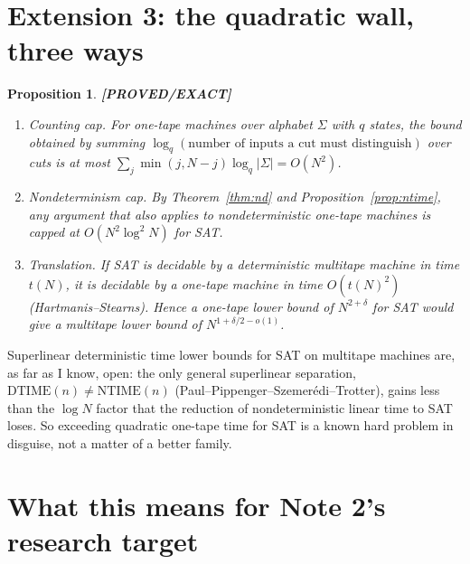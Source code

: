 \documentclass[11pt]{article}
\newtheorem{proposition}[theorem]{Proposition}
\theoremstyle{remark}
\newcommand{\status}[1]{\textbf{[#1]}}
\begin{document}
\section{Extension 3: the quadratic wall, three ways}

\begin{proposition}\label{prop:wall} \status{PROVED/EXACT}
\begin{enumerate}
\item \emph{Counting cap.} For one-tape machines over alphabet $\Sigma$ with $q$ states, the bound obtained by
summing $\log_q(\text{number of inputs a cut must distinguish})$ over cuts is at most
$\sum_j\min(j,N-j)\log_q|\Sigma|=O(N^2)$.
\item \emph{Nondeterminism cap.} By Theorem~\ref{thm:nd} and Proposition~\ref{prop:ntime}, any argument that
also applies to nondeterministic one-tape machines is capped at $O(N^2\log^2N)$ for SAT.
\item \emph{Translation.} If SAT is decidable by a deterministic multitape machine in time $t(N)$, it is
decidable by a one-tape machine in time $O(t(N)^2)$ (Hartmanis--Stearns). Hence a one-tape lower bound of
$N^{2+\delta}$ for SAT would give a multitape lower bound of $N^{1+\delta/2-o(1)}$.
\end{enumerate}
\end{proposition}

\noindent Superlinear deterministic time lower bounds for SAT on multitape machines are, as far as I know,
open: the only general superlinear separation, $\mathrm{DTIME}(n)\ne\mathrm{NTIME}(n)$
(Paul--Pippenger--Szemer\'edi--Trotter), gains less than the $\log N$ factor that the reduction of
nondeterministic linear time to SAT loses. So exceeding quadratic one-tape time for SAT is a known hard problem
in disguise, not a matter of a better family.

\section{What this means for Note 2's research target}
\end{document}
